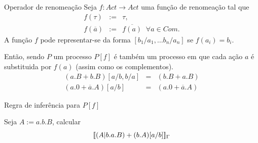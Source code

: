 \documentclass[aspectratio=169]{beamer}
\begin{document}
\begin{frame}{Operador de renomeação}
Seja $f:Act\to Act$ uma função de renomeação tal que \begin{eqnarray*}
	f(\tau)&:=&\tau,\\
f(\overline{a})&:=&\overline{f(a)}\;\; \forall a\in Com.
\end{eqnarray*}
	A função $f$ pode representar-se da forma $[b_1/a_1, \ldots b_n/a_n]$ se $f(a_i)=b_i$.

Então, sendo $P$ um processo $P[f]$ é também um processo em que cada ação $a$ é substituida por $f(a)$ (assim como os complementos).
\begin{eqnarray*}
(a.B+b.B)[a/b,b/a]&=& (b.B+a.B)\\
(a.0+\overline{a}.A)[a/b]&=&(a.0+\overline{a}.A)
\end{eqnarray*}
\end{frame}

\begin{frame}{Regra de inferência para $P[f]$}
	\begin{prooftree}
\end{prooftree}

\pause
\begin{exem}
	Seja $A:= a.b.B$, calcular	
$$[\![ (A|b.a.B)+(b.A)[a/b] ]\!]_\Gamma $$
\end{exem}

\end{frame}
\end{document}
